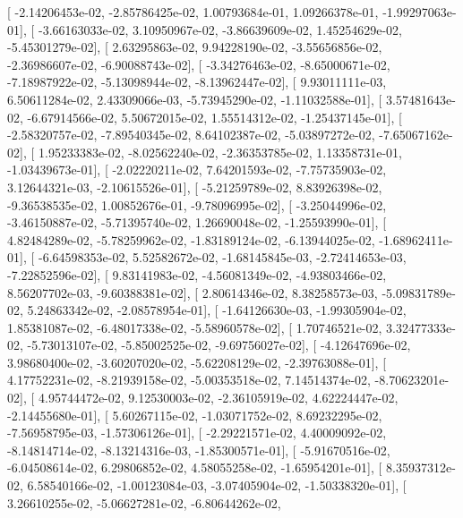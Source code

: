 \documentclass{article}
\begin{document}
       [ -2.14206453e-02,  -2.85786425e-02,   1.00793684e-01,
          1.09266378e-01,  -1.99297063e-01],
       [ -3.66163033e-02,   3.10950967e-02,  -3.86639609e-02,
          1.45254629e-02,  -5.45301279e-02],
       [  2.63295863e-02,   9.94228190e-02,  -3.55656856e-02,
         -2.36986607e-02,  -6.90088743e-02],
       [ -3.34276463e-02,  -8.65000671e-02,  -7.18987922e-02,
         -5.13098944e-02,  -8.13962447e-02],
       [  9.93011111e-03,   6.50611284e-02,   2.43309066e-03,
         -5.73945290e-02,  -1.11032588e-01],
       [  3.57481643e-02,  -6.67914566e-02,   5.50672015e-02,
          1.55514312e-02,  -1.25437145e-01],
       [ -2.58320757e-02,  -7.89540345e-02,   8.64102387e-02,
         -5.03897272e-02,  -7.65067162e-02],
       [  1.95233383e-02,  -8.02562240e-02,  -2.36353785e-02,
          1.13358731e-01,  -1.03439673e-01],
       [ -2.02220211e-02,   7.64201593e-02,  -7.75735903e-02,
          3.12644321e-03,  -2.10615526e-01],
       [ -5.21259789e-02,   8.83926398e-02,  -9.36538535e-02,
          1.00852676e-01,  -9.78096995e-02],
       [ -3.25044996e-02,  -3.46150887e-02,  -5.71395740e-02,
          1.26690048e-02,  -1.25593990e-01],
       [  4.82484289e-02,  -5.78259962e-02,  -1.83189124e-02,
         -6.13944025e-02,  -1.68962411e-01],
       [ -6.64598353e-02,   5.52582672e-02,  -1.68145845e-03,
         -2.72414653e-03,  -7.22852596e-02],
       [  9.83141983e-02,  -4.56081349e-02,  -4.93803466e-02,
          8.56207702e-03,  -9.60388381e-02],
       [  2.80614346e-02,   8.38258573e-03,  -5.09831789e-02,
          5.24863342e-02,  -2.08578954e-01],
       [ -1.64126630e-03,  -1.99305904e-02,   1.85381087e-02,
         -6.48017338e-02,  -5.58960578e-02],
       [  1.70746521e-02,   3.32477333e-02,  -5.73013107e-02,
         -5.85002525e-02,  -9.69756027e-02],
       [ -4.12647696e-02,   3.98680400e-02,  -3.60207020e-02,
         -5.62208129e-02,  -2.39763088e-01],
       [  4.17752231e-02,  -8.21939158e-02,  -5.00353518e-02,
          7.14514374e-02,  -8.70623201e-02],
       [  4.95744472e-02,   9.12530003e-02,  -2.36105919e-02,
          4.62224447e-02,  -2.14455680e-01],
       [  5.60267115e-02,  -1.03071752e-02,   8.69232295e-02,
         -7.56958795e-03,  -1.57306126e-01],
       [ -2.29221571e-02,   4.40009092e-02,  -8.14814714e-02,
         -8.13214316e-03,  -1.85300571e-01],
       [ -5.91670516e-02,  -6.04508614e-02,   6.29806852e-02,
          4.58055258e-02,  -1.65954201e-01],
       [  8.35937312e-02,   6.58540166e-02,  -1.00123084e-03,
         -3.07405904e-02,  -1.50338320e-01],
       [  3.26610255e-02,  -5.06627281e-02,  -6.80644262e-02,
\end{document}
